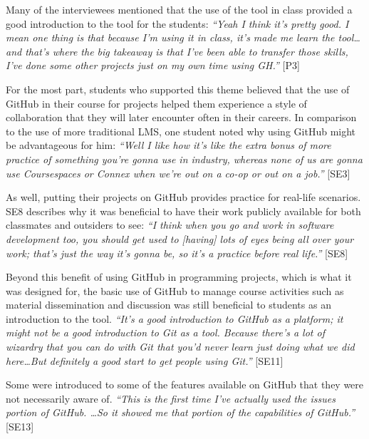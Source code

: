 Many of the interviewees mentioned that the use of the tool in class provided a good introduction to the tool for the students: \textit{``Yeah I think it's pretty good. I mean one thing is that because I'm using it in class, it's made me learn the tool\ldots and that's where the big takeaway is that I've been able to transfer those skills, I've done some other projects just on my own time using GH.''} [P3]


For the most part, students who supported this theme believed that the use of GitHub in their course for projects helped them experience a style of collaboration that they will later encounter often in their careers. In comparison to the use of more traditional LMS, one student noted why using GitHub might be advantageous for him: \textit{``Well I like how it's like the extra bonus of more practice of something you're gonna use in industry, whereas none of us are gonna use Coursespaces or Connex when we're out on a co-op or out on a job.''} [SE3]

As well, putting their projects on GitHub provides practice for real-life scenarios. SE8 describes why it was beneficial to have their work publicly available for both classmates and outsiders to see: \textit{``I think when you go and work in software development too, you should get used to [having] lots of eyes being all over your work; that's just the way it's gonna be, so it's a practice before real life.''} [SE8]

Beyond this benefit of using GitHub in programming projects, which is what it was designed for, the basic use of GitHub to manage course activities such as material dissemination and discussion was still beneficial to students as an introduction to the tool. \textit{``It's a good introduction to GitHub as a platform; it might not be a good introduction to Git as a tool. Because there's a lot of wizardry that you can do with Git that you'd never learn just doing what we did here\ldots But definitely a good start to get people using Git.''} [SE11]

Some were introduced to some of the features available on GitHub that they were not necessarily aware of. \textit{``This is the first time I've actually used the issues portion of GitHub. \ldots So it showed me that portion of the capabilities of GitHub.''} [SE13]

